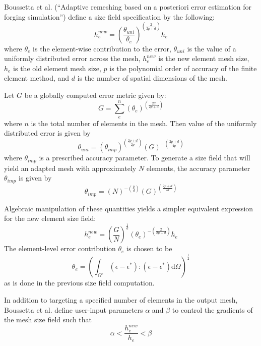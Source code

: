 \documentclass{article}
\begin{document}
Boussetta et al. (``Adaptive remeshing based on a posteriori error
estimation for forging simulation'') define a size field specification
by the following:
\[
h^{new}_e = \left(
\frac{\theta_{uni}}{\theta_e} \right)
^{( \frac{2}{2p +d} )} h_e
\]
where $\theta_e$ is the element-wise contribution to the error,
$\theta_{uni}$ is the value of a uniformly distributed error
across the mesh, $h_e^{new}$ is the new element mesh size,
$h_e$ is the old element mesh size, $p$ is the polynomial order
of accuracy of the finite element method, and $d$ is the number
of spatial dimensions of the mesh.

Let $G$ be a globally computed error metric given by:
\[
G = \sum_e^n \left( \theta_e \right) ^{(\frac{2d}{2p+d})}
\]
where $n$ is the total number of elements in the mesh.
Then value of the uniformly distributed error is given by
\[
\theta_{uni} = \left( \theta_{imp} \right) ^{( \frac{2p+d}{2p} )}
\left( G \right) ^{-(\frac{2p+d}{4p} )}
\]
where $\theta_{imp}$ is a prescribed accuracy parameter. 
To generate a size field that will yield an adapted
mesh with approximately $N$ elements, the accuracy parameter
$\theta_{imp}$ is given by
\[
\theta_{imp} = \left( N \right) ^{-(\frac{p}{d})}
\left( G \right)^{(\frac{2p+d}{2d})}
\]

Algebraic manipulation of these quantities yields a simpler
equivalent expression for the new element size field:
\[
h_e^{new} = \left(\frac{G}{N}\right)^{\frac{1}{d}}
\left( \theta_e \right)^{-(\frac{2}{2p+d})} h_e
\]
The element-level error contribution $\theta_e$ is chosen to be
\[
\theta_e = \left( 
\int_{\Omega^e}(\epsilon - \epsilon^*) : (\epsilon - \epsilon^*)
\text{d} \Omega
\right) ^{\frac{1}{2}}
\]
as is done in the previous size field computation.

In addition to targeting a specified number of elements in the
output mesh, Boussetta et al. define user-input parameters
$\alpha$ and $\beta$ to control the gradients of the mesh size
field such that
\[
\alpha < \frac{h_e^{new}}{h_e} < \beta
\]
\end{document}

